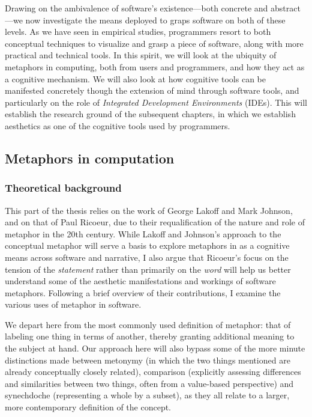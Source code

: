 Drawing on the ambivalence of software's existence—both concrete and abstract—we now investigate the means deployed to graps software on both of these levels. As we have seen in empirical studies, programmers resort to both conceptual techniques to visualize and grasp a piece of software, along with more practical and technical tools. In this spirit, we will look at the ubiquity of metaphors in computing,  both from users and programmers, and how they act as a cognitive mechanism. We will also look at how cognitive tools can be manifested concretely though the extension of mind through software tools, and particularly on the role of \emph{Integrated Development Environments} (IDEs). This will establish the research ground of the subsequent chapters, in which we establish aesthetics as one of the cognitive tools used by programmers.

\subsection{Metaphors in computation}

\subsubsection{Theoretical background}

This part of the thesis relies on the work of George Lakoff and Mark Johnson, and on that of Paul Ricoeur, due to their requalification of the nature and role of metaphor in the 20th century. While Lakoff and Johnson's approach to the conceptual metaphor will serve a basis to explore metaphors in as a cognitive means across software and narrative, I also argue that Ricoeur's focus on the tension of the \emph{statement} rather than primarily on the \emph{word} will help us better understand some of the aesthetic manifestations and workings of software metaphors. Following a brief overview of their contributions, I examine the various uses of metaphor in software.


We depart here from the most commonly used definition of metaphor: that of labeling one thing in terms of another, thereby granting additional meaning to the subject at hand. Our approach here will also bypass some of the more minute distinctions made between metonymy (in which the two things mentioned are already conceptually closely related), comparison (explicitly assessing differences and similarities between two things, often from a value-based perspective) and synechdoche (representing a whole by a subset), as they all relate to a larger, more contemporary definition of the concept.

